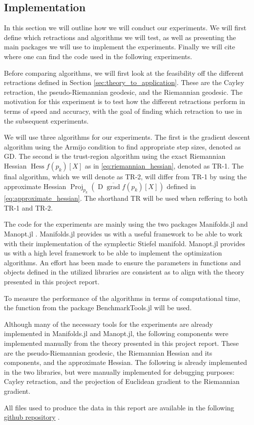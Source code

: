 \subsection{Implementation}
In this section we will outline how we will conduct our experiments. We will first define which retractions and algorithms we will test, as well as presenting the main packages we will use to implement the experiments. Finally we will cite where one can find the code used in the following experiments. 

Before comparing algorithms, we will first look at the feasibility off the different retractions defined in Section \ref{sec:theory_to_application}. These are the Cayley retraction, the pseudo-Riemannian geodesic, and the Riemannian geodesic. The motivation for this experiment is to test how the different retractions perform in terms of speed and accuracy, with the goal of finding which retraction to use in the subsequent experiments.

We will use three algorithms for our experiments. The first is the gradient descent algorithm using the Armijo condition to find appropriate step sizes, denoted as GD. The second is the trust-region algorithm using the exact Riemannian Hessian $\operatorname{Hess}f(p_{k})[X]$ as in \eqref{eq:riemannian_hessian}, denoted as TR-1. The final algorithm, which we will denote as TR-2, will differ from TR-1 by using the approximate Hessian $\operatorname{Proj}_{p_{k}}(\operatorname{D}\overline{\operatorname{grad}}f(p_{k})[X])$ defined in \eqref{eq:approximate_hessian}. The shorthand TR will be used when reffering to both TR-1 and TR-2.

The code for the experiments are mainly using the two packages Manifolds.jl \cite{AxenBaranBergmannRzecki:2023} and Manopt.jl \cite{Bergmann2022}. Manifolds.jl provides us with a useful framework to be able to work with their implementation of the symplectic Stiefel manifold. Manopt.jl provides us with a high level framework to be able to implement the optimization algorithms. An effort has been made to ensure the parameters in functions and objects defined in the utilized libraries are consistent as to align with the theory presented in this project report. 

To measure the performance of the algorithms in terms of computational time, the function  from the package BenchmarkTools.jl \cite{BenchmarkTools:2016} will be used.

Although many of the necessary tools for the experiments are already implemented in Manifolds.jl and Manopt.jl, the following components were implemented manually from the theory presented in this project report. These are the pseudo-Riemannian geodesic, the Riemannian Hessian and its components, and the approximate Hessian. The following is already implemented in the two libraries, but were manually implemented for debugging purposes: Cayley retraction, and the projection of Euclidean gradient to the Riemannian gradient. 

All files used to produce the data in this report are available in the following \href{https://github.com/kellertuer/TMA4500-Project-Hovland-Symplectic-Stiefel.git}{github repository} \cite{Hovland2024}. 